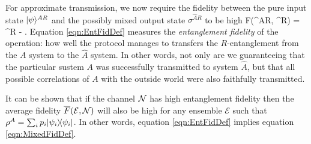 \documentclass[aps,11pt,twoside,letterpaper]{article}
\def\E{\mathcal{E}}
\begin{document}
			
			For approximate transmission, we now require the fidelity between the pure input state $| \psi \rangle^{AR}$ 
			and the possibly mixed output state $\sigma^{\widehat{A}R}$ to be high
			\be	\label{eqn:EntFidDef}
				F(\ket{\psi}^{AR}, \sigma^{R}) 
					= 		 \sigma^{R} 
					 - \epsilon.
			\ee
			Equation \eqref{eqn:EntFidDef} measures the \emph{entanglement fidelity} of the operation: 
			how well the protocol manages to transfers the $R$-entanglement from the $A$ system to the $\widehat{A}$
			system. 
            In other words, not only are we guaranteeing that the particular sustem $A$ was successfully 
            transmitted to system $\widehat{A}$, but that all possible correlations of $A$ with the outside
            world were also faithfully transmitted.

			It can be shown \cite{EntFid} that if the channel ${\cal N}$ has high entanglement fidelity then the 
			average fidelity  $\bar{F}(\E, \cN)$ will also be high for any ensemble $\E$ such that 
			$\rho^A=\sum_i p_i | \psi_i \rangle\!\langle \psi_i |$.
			In other words, equation \eqref{eqn:EntFidDef} implies equation \eqref{eqn:MixedFidDef}.

					
\end{document}
